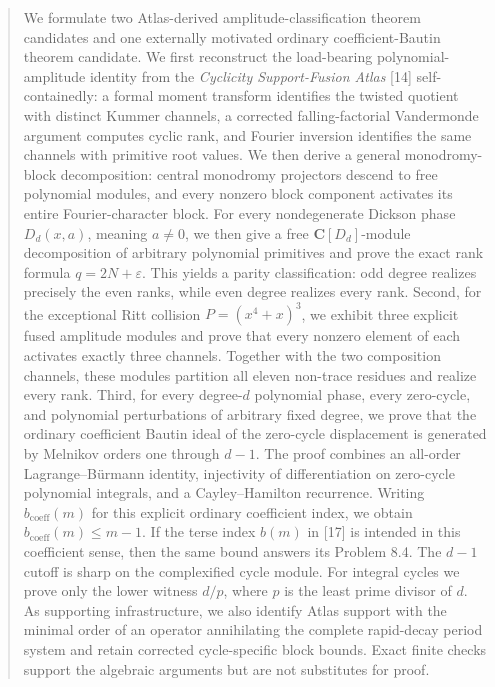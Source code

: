 \documentclass[
  11pt,
  a4paper,
]{amsart}
\begin{document}
\begin{abstract}
We formulate two Atlas-derived amplitude-classification theorem
candidates and one externally motivated ordinary coefficient-Bautin
theorem candidate. We first reconstruct the load-bearing
polynomial-amplitude identity from the \emph{Cyclicity Support-Fusion
Atlas} {[}14{]} self-containedly: a formal moment transform identifies
the twisted quotient with distinct Kummer channels, a corrected
falling-factorial Vandermonde argument computes cyclic rank, and Fourier
inversion identifies the same channels with primitive root values. We
then derive a general monodromy-block decomposition: central monodromy
projectors descend to free polynomial modules, and every nonzero block
component activates its entire Fourier-character block. For every
nondegenerate Dickson phase \(D_d(x,a)\), meaning \(a\ne0\), we then
give a free \(\mathbf C[D_d]\)-module decomposition of arbitrary
polynomial primitives and prove the exact rank formula
\(q=2N+\varepsilon\). This yields a parity classification: odd degree
realizes precisely the even ranks, while even degree realizes every
rank. Second, for the exceptional Ritt collision \(P=(x^4+x)^3\), we
exhibit three explicit fused amplitude modules and prove that every
nonzero element of each activates exactly three channels. Together with
the two composition channels, these modules partition all eleven
non-trace residues and realize every rank. Third, for every degree-\(d\)
polynomial phase, every zero-cycle, and polynomial perturbations of
arbitrary fixed degree, we prove that the ordinary coefficient Bautin
ideal of the zero-cycle displacement is generated by Melnikov orders one
through \(d-1\). The proof combines an all-order Lagrange--Bürmann
identity, injectivity of differentiation on zero-cycle polynomial
integrals, and a Cayley--Hamilton recurrence. Writing
\(b_{\mathrm{coeff}}(m)\) for this explicit ordinary coefficient index,
we obtain \(b_{\mathrm{coeff}}(m)\le m-1\). If the terse index \(b(m)\)
in {[}17{]} is intended in this coefficient sense, then the same bound
answers its Problem 8.4. The \(d-1\) cutoff is sharp on the complexified
cycle module. For integral cycles we prove only the lower witness
\(d/p\), where \(p\) is the least prime divisor of \(d\). As supporting
infrastructure, we also identify Atlas support with the minimal order of
an operator annihilating the complete rapid-decay period system and
retain corrected cycle-specific block bounds. Exact finite checks
support the algebraic arguments but are not substitutes for proof.

\end{abstract}
\end{document}
